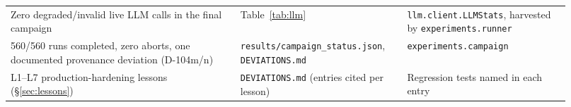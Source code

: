 \begin{center}
\begin{tabular}{@{}p{0.38\linewidth}p{0.27\linewidth}p{0.27\linewidth}@{}}
Zero degraded/invalid live LLM calls in the final campaign &
  Table~\ref{tab:llm} &
  \texttt{llm.client.LLMStats}, harvested by \texttt{experiments.runner} \\
560/560 runs completed, zero aborts, one documented provenance deviation (D-104m/n) &
  \texttt{results/\allowbreak campaign\_status.json}, \texttt{DEVIATIONS.md} &
  \texttt{experiments.campaign} \\
L1--L7 production-hardening lessons (\S\ref{sec:lessons}) &
  \texttt{DEVIATIONS.md} (entries cited per lesson) &
  Regression tests named in each entry \\
\bottomrule
\end{tabular}
\end{center}
